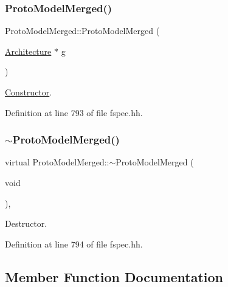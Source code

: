 \subsubsection{\texorpdfstring{ProtoModelMerged()}{ProtoModelMerged()}}
{\footnotesize\ttfamily Proto\+Model\+Merged\+::\+Proto\+Model\+Merged (\begin{DoxyParamCaption}\item[{\mbox{\hyperlink{class_architecture}{Architecture}} $\ast$}]{g }\end{DoxyParamCaption})\hspace{0.3cm}{\ttfamily [inline]}}



\mbox{\hyperlink{class_constructor}{Constructor}}. 



Definition at line 793 of file fspec.\+hh.

\mbox{\label{class_proto_model_merged_ae9e2963a988d626416b0020fe1229a47}} 
\subsubsection{\texorpdfstring{$\sim$ProtoModelMerged()}{~ProtoModelMerged()}}
{\footnotesize\ttfamily virtual Proto\+Model\+Merged\+::$\sim$\+Proto\+Model\+Merged (\begin{DoxyParamCaption}\item[{void}]{ }\end{DoxyParamCaption})\hspace{0.3cm}{\ttfamily [inline]}, {\ttfamily [virtual]}}



Destructor. 



Definition at line 794 of file fspec.\+hh.



\subsection{Member Function Documentation}
\mbox{\label{class_proto_model_merged_a735f43c1161758dcb6e8e2caf6e1c51c}} 
